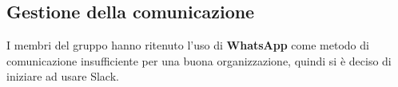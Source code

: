\subsection{Gestione della comunicazione}
I membri del gruppo hanno ritenuto l'uso di \textbf{WhatsApp} come metodo di comunicazione insufficiente per una buona organizzazione, quindi si è deciso di iniziare ad usare Slack.

\clearpage